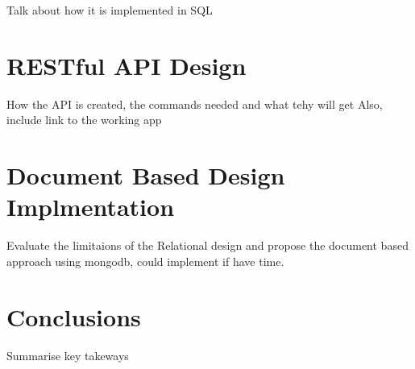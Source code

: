 \documentclass[english]{article}
\begin{document}
Talk about how it is implemented in SQL

\section{RESTful API Design}

How the API is created, the commands needed and what tehy will get
Also, include link to the working app

\section{Document Based Design Implmentation}

Evaluate the limitaions of the Relational design and propose the document based approach using mongodb, could implement if have time.

\section{Conclusions}

Summarise key takeways

\clearpage

\clearpage




\clearpage

\end{document}

